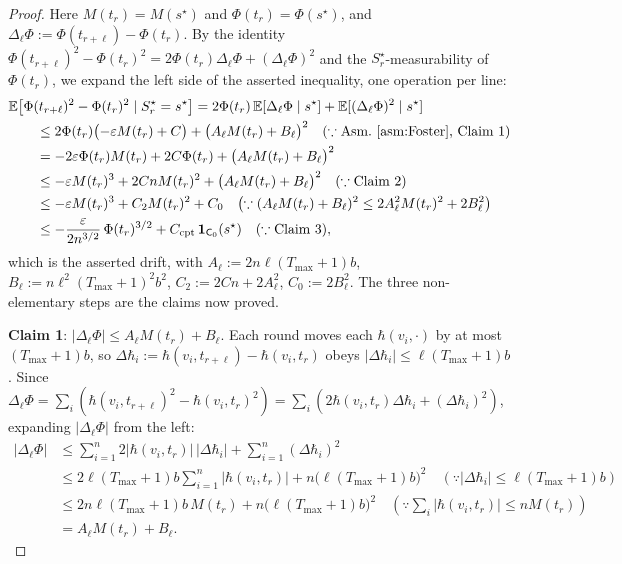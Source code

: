 \documentclass[11pt]{article}
\theoremstyle{definition}
\begin{document}
\begin{proof}
Here $M(t_r) = M(s^{\star})$ and $\Phi(t_r) = \Phi(s^{\star})$, and $\Delta_\ell\Phi := \Phi(t_{r+\ell}) - \Phi(t_r)$. By the identity $\Phi(t_{r+\ell})^2 - \Phi(t_r)^2 = 2\Phi(t_r)\Delta_\ell\Phi + (\Delta_\ell\Phi)^2$ and the $S^{\star}_r$-measurability of $\Phi(t_r)$, we expand the left side of the asserted inequality, one operation per line:
\begin{align*}
  \MoveEqLeft[2] \mathbb{E}\bigl[\Phi(t_{r+\ell})^2 - \Phi(t_r)^2 \mid S^{\star}_r = s^{\star}\bigr]
  = 2\Phi(t_r)\,\mathbb{E}[\Delta_\ell\Phi \mid s^{\star}] + \mathbb{E}[(\Delta_\ell\Phi)^2 \mid s^{\star}] \\
  &\leq 2\Phi(t_r)\bigl(-\varepsilon M(t_r) + C\bigr) + \bigl(A_\ell M(t_r) + B_\ell\bigr)^2
     \quad (\because \text{Asm.~\ref{asm:Foster}, Claim 1}) \\
  &= -2\varepsilon\Phi(t_r) M(t_r) + 2C\Phi(t_r) + \bigl(A_\ell M(t_r) + B_\ell\bigr)^2 \\
  &\leq -\varepsilon M(t_r)^3 + 2Cn M(t_r)^2 + \bigl(A_\ell M(t_r) + B_\ell\bigr)^2
     \quad (\because \text{Claim 2}) \\
  &\leq -\varepsilon M(t_r)^3 + C_2 M(t_r)^2 + C_0
     \quad \bigl(\because (A_\ell M(t_r) + B_\ell)^2 \leq 2A_\ell^2 M(t_r)^2 + 2B_\ell^2\bigr) \\
  &\leq -\frac{\varepsilon}{2n^{3/2}}\,\Phi(t_r)^{3/2} + C_{\mathrm{cpt}}\,\mathbf{1}_{\mathsf{C}_0}(s^{\star})
     \quad (\because \text{Claim 3}) ,
\end{align*}
which is the asserted drift, with $A_\ell := 2n\ell(T_{\max}+1)b$, $B_\ell := n\ell^2(T_{\max}+1)^2 b^2$, $C_2 := 2Cn + 2A_\ell^2$, $C_0 := 2B_\ell^2$. The three non-elementary steps are the claims now proved.

\smallskip\noindent\textbf{Claim 1}: $|\Delta_\ell\Phi| \leq A_\ell M(t_r) + B_\ell$. Each round moves each $\hbar(v_i, \cdot)$ by at most $(T_{\max}+1)b$, so $\Delta\hbar_i := \hbar(v_i, t_{r+\ell}) - \hbar(v_i, t_r)$ obeys $|\Delta\hbar_i| \leq \ell(T_{\max}+1)b$. Since $\Delta_\ell\Phi = \sum_i(\hbar(v_i, t_{r+\ell})^2 - \hbar(v_i, t_r)^2) = \sum_i(2\hbar(v_i, t_r)\Delta\hbar_i + (\Delta\hbar_i)^2)$, expanding $|\Delta_\ell\Phi|$ from the left:
\begin{align*}
  |\Delta_\ell\Phi|
  &\leq \sum_{i=1}^n 2|\hbar(v_i, t_r)|\,|\Delta\hbar_i| + \sum_{i=1}^n (\Delta\hbar_i)^2 \\
  &\leq 2\ell(T_{\max}+1)b \sum_{i=1}^n |\hbar(v_i, t_r)| + n\bigl(\ell(T_{\max}+1)b\bigr)^2
     \quad (\because |\Delta\hbar_i| \leq \ell(T_{\max}+1)b) \\
  &\leq 2n\ell(T_{\max}+1)b\, M(t_r) + n\bigl(\ell(T_{\max}+1)b\bigr)^2
     \quad (\because \textstyle\sum_i |\hbar(v_i, t_r)| \leq nM(t_r)) \\
  &= A_\ell M(t_r) + B_\ell .
\end{align*}


\end{proof}
\end{document}
